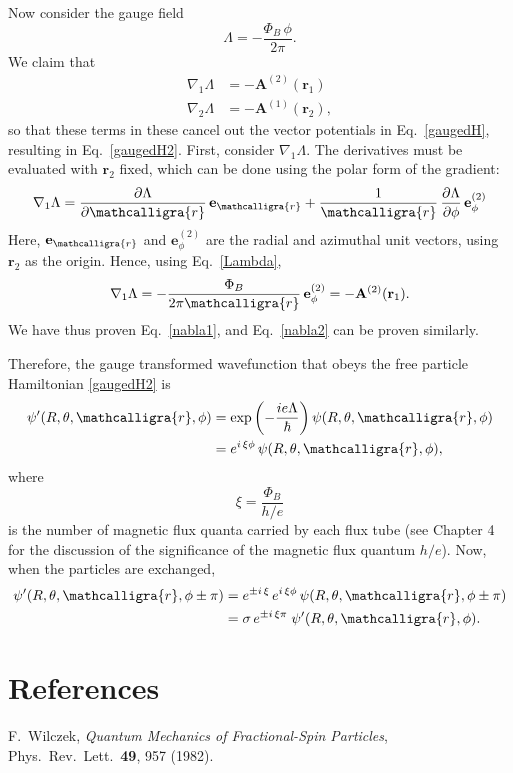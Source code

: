 \documentclass[pra,12pt]{revtex4}
\begin{document}
Now consider the gauge field
\begin{equation}
  \Lambda = -\frac{\Phi_B \,\phi}{2\pi}.
  \label{Lambda}
\end{equation}
We claim that
\begin{align}
  \nabla_1 \Lambda &= - \mathbf{A}^{(2)}(\mathbf{r}_1) \label{nabla1} \\
  \nabla_2 \Lambda &= - \mathbf{A}^{(1)}(\mathbf{r}_2), \label{nabla2}
\end{align}
so that these terms in these cancel out the vector potentials in
Eq.~\eqref{gaugedH}, resulting in Eq.~\eqref{gaugedH2}.  First,
consider $\nabla_1\Lambda$.  The derivatives must be evaluated with
$\mathbf{r}_2$ fixed, which can be done using the polar form of the
gradient:
\begin{equation}
  \nabla_1\Lambda =  \frac{\partial
    \Lambda}{\partial \mathcalligra{r}} \, \mathbf{e}_{\mathcalligra{r}}
  + \frac{1}{\mathcalligra{r}} \,\frac{\partial \Lambda}{\partial \phi}
  \, \mathbf{e}^{(2)}_{\phi}
\end{equation}
Here, $\mathbf{e}_{\mathcalligra{r}}$ and $\mathbf{e}^{(2)}_{\phi}$
are the radial and azimuthal unit vectors, using $\mathbf{r}_2$ as the
origin.  Hence, using Eq.~\eqref{Lambda},
\begin{equation}
  \nabla_1\Lambda = - \frac{\Phi_B}{2\pi\mathcalligra{r}} \,
  \mathbf{e}^{(2)}_{\phi} = - \mathbf{A}^{(2)}(\mathbf{r}_1).
\end{equation}
We have thus proven Eq.~\eqref{nabla1}, and Eq.~\eqref{nabla2} can be
proven similarly.

Therefore, the gauge transformed wavefunction that obeys the free
particle Hamiltonian \eqref{gaugedH2} is
\begin{align}
  \begin{aligned}
  \psi'(R, \theta, \mathcalligra{r}, \phi)
  &= \exp\left(-\frac{ie\Lambda}{\hbar}\right) \psi(R, \theta, \mathcalligra{r}, \phi) \\
  &= e^{i \, \xi \phi}\, \psi(R, \theta, \mathcalligra{r}, \phi),
  \end{aligned}
\end{align}
where
\begin{equation}
  \xi = \frac{\Phi_B}{h/e}
\end{equation}
is the number of magnetic flux quanta carried by each flux tube (see
Chapter 4 for the discussion of the significance of the magnetic flux
quantum $h/e$).  Now, when the particles are exchanged,
\begin{align}
  \psi'(R, \theta, \mathcalligra{r}, \phi \pm \pi) &=
  e^{\pm i \, \xi} \,
  e^{i \, \xi \phi}\,
  \psi(R, \theta, \mathcalligra{r}, \phi \pm \pi) \\
  &= \sigma \,e^{\pm i \, \xi\pi}\;
  \psi'(R, \theta, \mathcalligra{r}, \phi).
\end{align}




\section*{References}

\begin{enumerate}[[1{]}]
\item F.~Wilczek, \textit{Quantum Mechanics of Fractional-Spin Particles},
  Phys.~Rev.~Lett.~\textbf{49}, 957 (1982).
  \label{cite:wilczek}
\end{enumerate}
\end{document}
